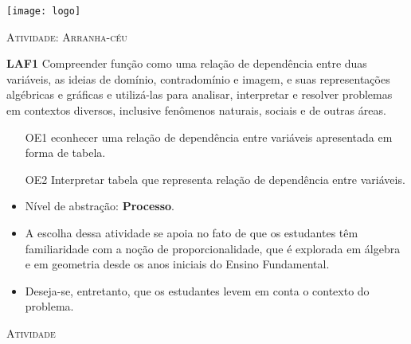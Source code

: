 \documentclass[10 pt,usenames,dvipsnames, oneside]{article}
\begin{document}
\begin{center}
  \begin{minipage}[l]{3cm}
\texttt{[image: logo]}    
\end{minipage}\hfill
\begin{minipage}[r]{.8\textwidth}
 {\Large \scshape Atividade: Arranha-céu}  
\end{minipage}
\end{center}
\vspace{.2cm}

\ifdefined\prof
\begin{objetivos}
\item \textbf{LAF1} Compreender função como uma relação de dependência entre duas variáveis, as ideias de domínio, contradomínio e imagem, e suas representações algébricas e gráficas e utilizá-las para analisar, interpretar e resolver problemas em contextos diversos, inclusive fenômenos naturais, sociais e de outras áreas.
\end{objetivos}

\begin{goals}
\begin{enumerate}

\item[OE1] econhecer uma relação de dependência entre variáveis apresentada em forma de tabela.

\item[OE2] Interpretar tabela que representa relação de dependência entre variáveis.

\end{enumerate}

\tcblower

\begin{itemize}
\item Nível de abstração: \textbf{Processo}.

\item A escolha dessa atividade se apoia no fato de que os estudantes têm familiaridade com a noção de proporcionalidade, que é explorada em álgebra e em geometria desde os anos iniciais do Ensino Fundamental.

\item Deseja-se, entretanto, que os estudantes levem em conta o contexto do problema.
\end{itemize}

\end{goals}

\bigskip
\begin{center}
{\large \scshape Atividade}
\end{center}
\fi
\end{document}
